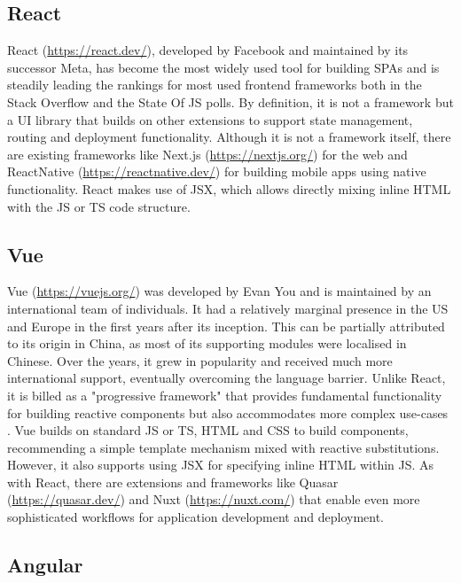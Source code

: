 \subsection{React}

React (\url{https://react.dev/}), developed by Facebook and maintained by its successor Meta, has become the most widely used tool for building \ac{SPA}s and is steadily leading the rankings for most used frontend frameworks both in the Stack Overflow \parencite{stackOverflowPollWebFrameworks23} and the State Of JS \parencite{mostUsedFrontendFrameworks22} polls. By definition, it is not a framework but a \ac{UI} library that builds on other extensions to support state management, routing and deployment functionality. Although it is not a framework itself, there are existing frameworks like Next.js (\url{https://nextjs.org/}) for the web and ReactNative (\url{https://reactnative.dev/}) for building mobile apps using native functionality. React makes use of \ac{JSX}, which allows directly mixing inline \ac{HTML} with the \ac{JS} or \ac{TS} code structure.

\subsection{Vue}

Vue (\url{https://vuejs.org/}) was developed by Evan You and is maintained by an international team of individuals. It had a relatively marginal presence in the US and Europe in the first years after its inception. This can be partially attributed to its origin in China, as most of its supporting modules were localised in Chinese. Over the years, it grew in popularity and received much more international support, eventually overcoming the language barrier. Unlike React, it is billed as a "progressive framework" that provides fundamental functionality for building reactive components but also accommodates more complex use-cases \parencite{vueProgressiveFramework}. Vue builds on standard \ac{JS} or \ac{TS}, \ac{HTML} and \ac{CSS} to build components, recommending a simple template mechanism mixed with reactive substitutions. However, it also supports using \ac{JSX} for specifying inline \ac{HTML} within \ac{JS}. As with React, there are extensions and frameworks like Quasar (\url{https://quasar.dev/}) and Nuxt (\url{https://nuxt.com/}) that enable even more sophisticated workflows for application development and deployment.

\subsection{Angular}

